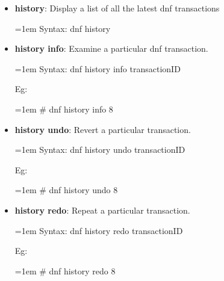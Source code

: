 \begin{flushleft}
\begin{itemize}
		\item \textbf{history}: Display a list of all the latest dnf transactions
		\begin{tcolorbox}[breakable,notitle,boxrule=-0pt,colback=pink,colframe=pink]
			\color{black}
			\font=1em
			Syntax: dnf history
			\font=4pt
		\end{tcolorbox}
		\bigskip
		\bigskip			

		\item \textbf{history info}: Examine a particular dnf transaction.
		\begin{tcolorbox}[breakable,notitle,boxrule=-0pt,colback=pink,colframe=pink]
			\color{black}
			\font=1em
			Syntax: dnf history info transactionID
			\font=4pt
		\end{tcolorbox}
		Eg:
		\begin{tcolorbox}[breakable,notitle,boxrule=-0pt,colback=black,colframe=black]
			\color{green}
			\font=1em
			\# dnf history info 8
			\font=4pt
		\end{tcolorbox}
		\bigskip
		\bigskip			

		\item \textbf{history undo}: Revert a particular transaction.
		\begin{tcolorbox}[breakable,notitle,boxrule=-0pt,colback=pink,colframe=pink]
			\color{black}
			\font=1em
			Syntax: dnf history undo transactionID
			\font=4pt
		\end{tcolorbox}
		Eg:
		\begin{tcolorbox}[breakable,notitle,boxrule=-0pt,colback=black,colframe=black]
			\color{green}
			\font=1em
			\# dnf history undo 8
			\font=4pt
		\end{tcolorbox}
		\bigskip
		\bigskip			
		\newpage
		\item \textbf{history redo}: Repeat a particular transaction.
		\begin{tcolorbox}[breakable,notitle,boxrule=-0pt,colback=pink,colframe=pink]
			\color{black}
			\font=1em
			Syntax: dnf history redo transactionID
			\font=4pt
		\end{tcolorbox}
		Eg:
		\begin{tcolorbox}[breakable,notitle,boxrule=-0pt,colback=black,colframe=black]
			\color{green}
			\font=1em
			\# dnf history redo 8
			\font=4pt
		\end{tcolorbox}
		\bigskip
		\bigskip		
		

\end{itemize}
\end{flushleft}
